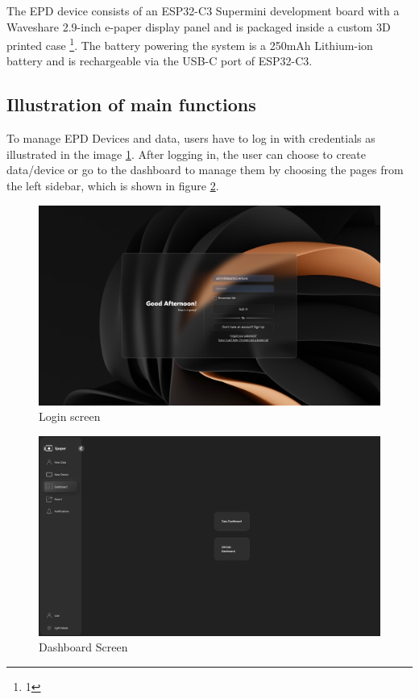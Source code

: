 \documentclass[../Main.tex]{subfiles}
\begin{document}
The EPD device consists of an ESP32-C3 Supermini development board with a Waveshare 2.9-inch e-paper display panel and is packaged inside a custom 3D printed case \footnote{1}. The battery powering the system is a 250mAh Lithium-ion battery and is rechargeable via the USB-C port of ESP32-C3.

\subsection{Illustration of main functions}
To manage EPD Devices and data, users have to log in with credentials as illustrated in the image \ref{fig:login-screen}. After logging in, the user can choose to create data/device or go to the dashboard to manage them by choosing the pages from the left sidebar, which is shown in figure \ref{fig:dashboard}. 
\begin{figure}[H]
    \centering
    \includegraphics[width=0.8\linewidth]{doc//imgs/ui_login.png}
    \caption{Login screen}
    \label{fig:login-screen}
\end{figure}

\begin{figure}[H]
    \centering
    \includegraphics[width=0.8\linewidth]{doc//imgs/ui_dashboard.png}

    \caption{Dashboard Screen}
    \label{fig:dashboard}
\end{figure}
\end{document}
